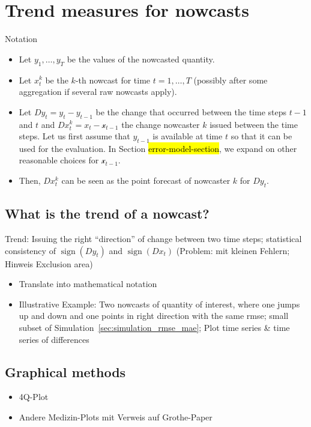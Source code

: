 \documentclass[oneside]{article}
\theoremstyle{plain}%
\theoremstyle{definition}
\DeclareMathOperator{\sign}{sign}
\newcommand{\ydiff}{D y}
\newcommand{\xdiff}{Dx}
\begin{document}
\section{Trend measures for nowcasts}

Notation
\begin{itemize}
  \item Let $y_1, \ldots, y_T$ be the values of the nowcasted quantity.
  \item Let $x_t^k$ be the $k$-th nowcast for time $t = 1, \ldots, T$ (possibly after some aggregation if several raw nowcasts apply).
  \item Let $\ydiff_t = y_t - y_{t-1}$ be the change that occurred between the time steps $t-1$ and $t$ and $\xdiff_t^k = x_t - \mathcal{x}_{t-1}$ the change nowcaster $k$ issued between the time steps. Let us first assume that $y_{t-1}$ is available at time $t$ so that it can be used for the evaluation. 
  In Section \hl{error-model-section}, we expand on other reasonable choices for $\mathcal{x}_{t-1}$.
  \item Then, $\xdiff_t^k$ can be seen as the point forecast of nowcaster $k$ for $\ydiff_t$. 
\end{itemize}

\subsection{What is the trend of a nowcast?}

Trend: Issuing the right \enquote{direction} of change between two time steps; statistical consistency of $\sign(\ydiff_t)$ and $\sign(\xdiff_t)$ (Problem: mit kleinen Fehlern; Hinweis Exclusion area)

\begin{itemize}
  \item Translate into mathematical notation
  \item Illustrative Example: Two nowcasts of quantity of interest, where one jumps up and down and one points in right direction with the same rmse; small subset of Simulation~\ref{sec:simulation_rmse_mae}; Plot time series \& time series of differences
\end{itemize}

\subsection{Graphical methods}


\begin{itemize}
  \item 4Q-Plot
  \item Andere Medizin-Plots mit Verweis auf Grothe-Paper
\end{itemize}
\end{document}
